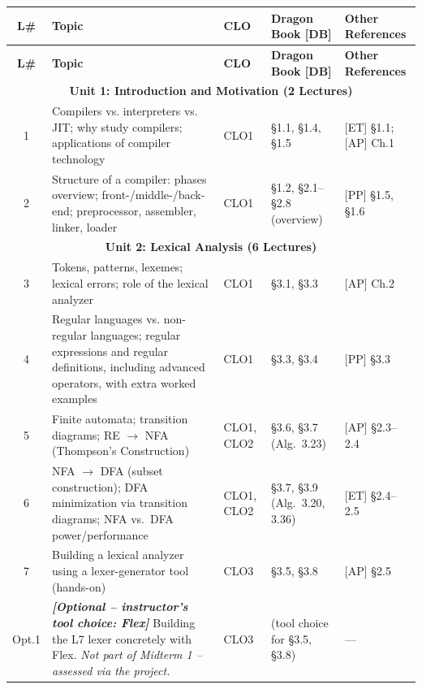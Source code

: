 \documentclass{article}
\begin{document}
\renewcommand{\arraystretch}{1.35}
\setlength{\tabcolsep}{4pt}
\footnotesize
\begin{longtable}{|c|p{5.1cm}|p{1.1cm}|p{2.5cm}|p{3.3cm}|}
\hline
\textbf{L\#} & \textbf{Topic} & \textbf{CLO} & \textbf{Dragon Book [DB]} & \textbf{Other References} \\ \hline
\endfirsthead
\hline
\textbf{L\#} & \textbf{Topic} & \textbf{CLO} & \textbf{Dragon Book [DB]} & \textbf{Other References} \\ \hline
\endhead

\multicolumn{5}{|c|}{\cellcolor{gray!20}\textbf{Unit 1: Introduction and Motivation (2 Lectures)}} \\ \hline
1 & Compilers vs. interpreters vs. JIT; why study compilers; applications of compiler technology & CLO1 & \S1.1, \S1.4, \S1.5 & [ET] \S1.1; [AP] Ch.1 \\ \hline
2 & Structure of a compiler: phases overview; front-/middle-/back-end; preprocessor, assembler, linker, loader & CLO1 & \S1.2, \S2.1--\S2.8 (overview) & [PP] \S1.5, \S1.6 \\ \hline

\multicolumn{5}{|c|}{\cellcolor{gray!20}\textbf{Unit 2: Lexical Analysis (6 Lectures)}} \\ \hline
3 & Tokens, patterns, lexemes; lexical errors; role of the lexical analyzer & CLO1 & \S3.1, \S3.3 & [AP] Ch.2 \\ \hline
4 & Regular languages vs. non-regular languages; regular expressions and regular definitions, including advanced operators, with extra worked examples & CLO1 & \S3.3, \S3.4 & [PP] \S3.3 \\ \hline
5 & Finite automata; transition diagrams; RE $\to$ NFA (Thompson's Construction) & CLO1, CLO2 & \S3.6, \S3.7 (Alg.~3.23) & [AP] \S2.3--2.4 \\ \hline
6 & NFA $\to$ DFA (subset construction); DFA minimization via transition diagrams; NFA vs.\ DFA power/performance & CLO1, CLO2 & \S3.7, \S3.9 (Alg.~3.20, 3.36) & [ET] \S2.4--2.5 \\ \hline
7 & Building a lexical analyzer using a lexer-generator tool (hands-on) & CLO3 & \S3.5, \S3.8 & [AP] \S2.5 \\ \hline
\rowcolor{blue!8}
Opt.1 & \emph{\textbf{[Optional -- instructor's tool choice: Flex]}} Building the L7 lexer concretely with Flex. \emph{Not part of Midterm 1 -- assessed via the project.} & CLO3 & (tool choice for \S3.5, \S3.8) & --- \\ \hline


\end{longtable}
\end{document}
